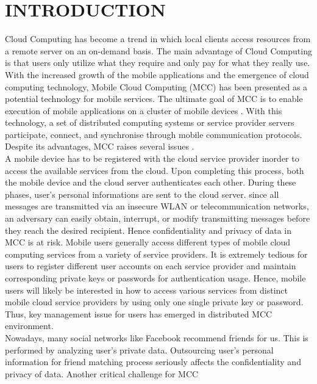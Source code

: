 \documentclass[10pt,a4paper,journal]{IEEEtran}
\begin{document}
\section{INTRODUCTION}
Cloud Computing \cite{16} has become a trend in which local clients access resources from a remote server on an on-demand basis. The main advantage of Cloud Computing is that users only utilize what they require and only pay for what they really use. With the increased growth of the mobile applications and the emergence of cloud computing technology, Mobile Cloud Computing (MCC) \cite{7} has been presented as a potential technology for mobile services. The ultimate goal of MCC is to enable execution of mobile applications on a cluster of mobile devices \cite{8}. With this technology, a set of distributed computing systems or service provider servers participate, connect, and synchronise through mobile communication protocols. Despite its advantages, MCC raises several issues \cite{6}. \\
\hspace*{2em} A mobile device has to be registered with the cloud service provider inorder to access the available services from the cloud. Upon completing this process, both the mobile device and the cloud server authenticates each other. During these phases, user's personal informations are sent to the cloud server. since all messages are transmitted via an
insecure WLAN or telecommunication networks, an adversary can easily obtain, interrupt,
or modify transmitting messages before they reach the desired recipient. Hence confidentiality and privacy of data in MCC is at risk. Mobile users generally access different types of mobile cloud computing services from a variety of service providers. It is extremely tedious for users to register different user accounts
on each service provider and maintain corresponding private keys or passwords for authentication usage. Hence, mobile users will likely be interested in how to
access various services from distinct mobile cloud service providers by using only one single
private key or password. Thus, key management issue for users has emerged in distributed MCC environment. \\
\hspace*{2em} Nowadays, many social networks like Facebook recommend friends for us. This
is performed by analyzing user's private data. Outsourcing user's personal information for
friend matching process seriously affects the confidentiality and privacy of data. Another critical challenge for MCC
\end{document}
